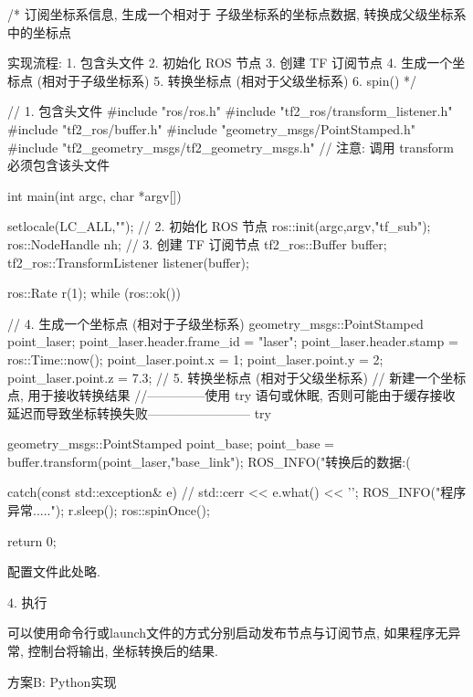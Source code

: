 \documentclass[openany, fontset=windowsold]{ctexbook}
\theoremstyle{kaiti}
\theoremstyle{normal}
\begin{document}
\begin{cpp}
  /*  
      订阅坐标系信息, 生成一个相对于 子级坐标系的坐标点数据, 转换成父级坐标系中的坐标点

      实现流程:
          1. 包含头文件
          2. 初始化 ROS 节点
          3. 创建 TF 订阅节点
          4. 生成一个坐标点 (相对于子级坐标系)
          5. 转换坐标点 (相对于父级坐标系)
          6. spin()
  */

  // 1. 包含头文件
  #include "ros/ros.h"
  #include "tf2_ros/transform_listener.h"
  #include "tf2_ros/buffer.h"
  #include "geometry_msgs/PointStamped.h"
  #include "tf2_geometry_msgs/tf2_geometry_msgs.h" // 注意: 调用 transform 必须包含该头文件

  int main(int argc, char *argv[])
  {
      setlocale(LC_ALL,"");
      // 2. 初始化 ROS 节点
      ros::init(argc,argv,"tf_sub");
      ros::NodeHandle nh;
      // 3. 创建 TF 订阅节点
      tf2_ros::Buffer buffer;
      tf2_ros::TransformListener listener(buffer);

      ros::Rate r(1);
      while (ros::ok())
      {
      // 4. 生成一个坐标点 (相对于子级坐标系)
          geometry_msgs::PointStamped point_laser;
          point_laser.header.frame_id = "laser";
          point_laser.header.stamp = ros::Time::now();
          point_laser.point.x = 1;
          point_laser.point.y = 2;
          point_laser.point.z = 7.3;
      // 5. 转换坐标点 (相对于父级坐标系)
          // 新建一个坐标点, 用于接收转换结果  
          //--------------使用 try 语句或休眠, 否则可能由于缓存接收延迟而导致坐标转换失败------------------------
          try
          {
              geometry_msgs::PointStamped point_base;
              point_base = buffer.transform(point_laser,"base_link");
              ROS_INFO("转换后的数据:(%

          }
          catch(const std::exception& e)
          {
              // std::cerr << e.what() << '\n';
              ROS_INFO("程序异常.....");
          }
          r.sleep();  
          ros::spinOnce();
      }
      return 0;
  }
\end{cpp}

配置文件此处略.

4. 执行

可以使用命令行或launch文件的方式分别启动发布节点与订阅节点, 如果程序无异常, 控制台将输出, 坐标转换后的结果.

方案B: Python实现
\end{document}

